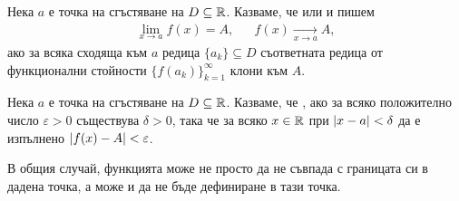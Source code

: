 \documentclass[numbers=endperiod, bibliography=totocnumbered]{scrartcl}
\begin{document}
\begin{definition}
  Нека \( a \) е точка на сгъстяване на \( D \subseteq \mathbb{R} \). Казваме, че  или  и пишем
  \begin{align*}
    \lim_{x \to a} f(x) = A,
    &&
    f(x) \underset {x \to a} \longrightarrow A,
  \end{align*}
  ако за всяка сходяща към \( a \) редица \( \{ a_k \} \subseteq D \) съответната редица от функционални стойности \( {\{ f(a_k) \}}_{k=1}^\infty \) клони към \( A \).
\end{definition}

\begin{definition}
  Нека \( a \) е точка на сгъстяване на \( D \subseteq \mathbb{R} \). Казваме, че , ако за всяко положително число \( \varepsilon > 0 \) съществува \( \delta > 0 \), така че за всяко \( x \in \mathbb{R} \) при \( \left\vert x - a \right\vert < \delta \) да е изпълнено \( \left\vert f(x) - A \right\vert < \varepsilon \).
\end{definition}

\begin{note}
  В общия случай, функцията може не просто да не съвпада с границата си в дадена точка, а може и да не бъде дефиниране в тази точка.
\end{note}
\end{document}
